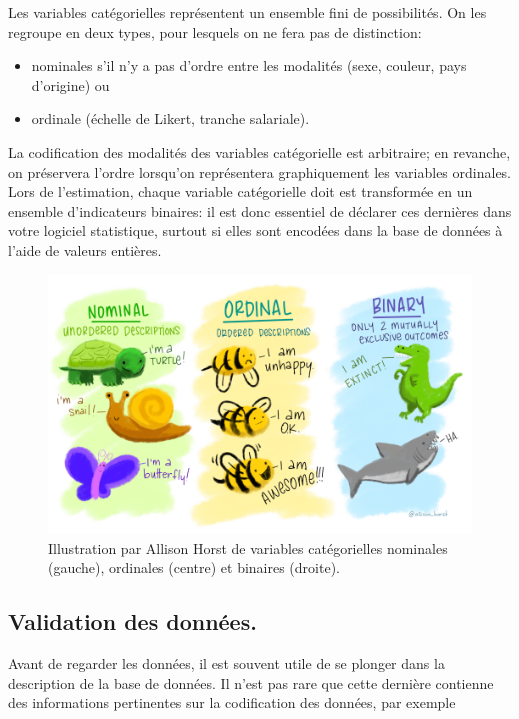\documentclass[
  11pt,
  letterpaper,
]{book}
\providecommand{\tightlist}{%
  \setlength{\itemsep}{0pt}\setlength{\parskip}{0pt}}
\theoremstyle{definition}
\theoremstyle{definition}
\theoremstyle{definition}
\theoremstyle{remark}
\begin{document}
Les variables catégorielles représentent un ensemble fini de possibilités. On les regroupe en deux types, pour lesquels on ne fera pas de distinction:

\begin{itemize}
\tightlist
\item
  nominales s'il n'y a pas d'ordre entre les modalités (sexe, couleur, pays d'origine) ou
\item
  ordinale (échelle de Likert, tranche salariale).
\end{itemize}

La codification des modalités des variables catégorielle est arbitraire; en revanche, on préservera l'ordre lorsqu'on représentera graphiquement les variables ordinales. Lors de l'estimation, chaque variable catégorielle doit est transformée en un ensemble d'indicateurs binaires: il est donc essentiel de déclarer ces dernières dans votre logiciel statistique, surtout si elles sont encodées dans la base de données à l'aide de valeurs entières.

\begin{figure}

{\centering \includegraphics[width=0.7\linewidth]{figures/nominal_ordinal_binary} 

}

\caption{Illustration par Allison Horst de variables catégorielles nominales (gauche), ordinales (centre) et binaires (droite).}\label{fig:variablescateg}
\end{figure}

\hypertarget{validation-des-donnuxe9es.}{%
\subsection{Validation des données.}\label{validation-des-donnuxe9es.}}

Avant de regarder les données, il est souvent utile de se plonger dans la description de la base de données. Il n'est pas rare que cette dernière contienne des informations pertinentes sur la codification des données, par exemple
\end{document}
